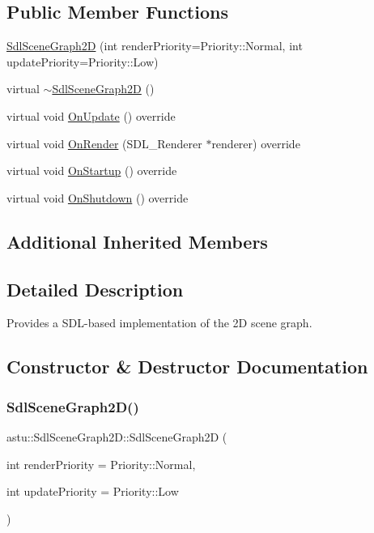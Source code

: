\subsection*{Public Member Functions}
\begin{DoxyCompactItemize}
\item 
\hyperlink{classastu_1_1SdlSceneGraph2D_a35aef61101cffcc9dbefc46837939084}{Sdl\+Scene\+Graph2D} (int render\+Priority=Priority\+::\+Normal, int update\+Priority=Priority\+::\+Low)
\item 
virtual \hyperlink{classastu_1_1SdlSceneGraph2D_af9eba7a73ba3e59f567cd43052ec78be}{$\sim$\+Sdl\+Scene\+Graph2D} ()
\item 
virtual void \hyperlink{classastu_1_1SdlSceneGraph2D_add3a6e67064379389068659addad0920}{On\+Update} () override
\item 
virtual void \hyperlink{classastu_1_1SdlSceneGraph2D_a2af5a74277e6478da29ba88d0f11daea}{On\+Render} (S\+D\+L\+\_\+\+Renderer $\ast$renderer) override
\item 
virtual void \hyperlink{classastu_1_1SdlSceneGraph2D_a141138f2cbda543b9bcbd0803e0ebd19}{On\+Startup} () override
\item 
virtual void \hyperlink{classastu_1_1SdlSceneGraph2D_a9d28b32e69cb7901ec2b05091b750642}{On\+Shutdown} () override
\end{DoxyCompactItemize}
\subsection*{Additional Inherited Members}


\subsection{Detailed Description}
Provides a S\+D\+L-\/based implementation of the 2D scene graph. 

\subsection{Constructor \& Destructor Documentation}
\mbox{\label{classastu_1_1SdlSceneGraph2D_a35aef61101cffcc9dbefc46837939084}} 
\subsubsection{\texorpdfstring{Sdl\+Scene\+Graph2\+D()}{SdlSceneGraph2D()}}
{\footnotesize\ttfamily astu\+::\+Sdl\+Scene\+Graph2\+D\+::\+Sdl\+Scene\+Graph2D (\begin{DoxyParamCaption}\item[{int}]{render\+Priority = {\ttfamily Priority\+:\+:Normal},  }\item[{int}]{update\+Priority = {\ttfamily Priority\+:\+:Low} }\end{DoxyParamCaption})}


